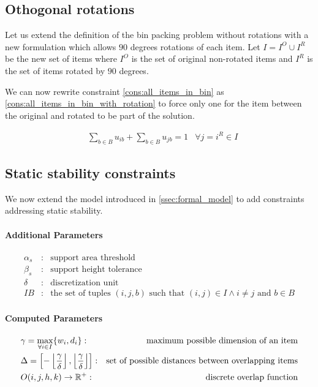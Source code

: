 \subsection*{Othogonal rotations}

Let us extend the definition of the bin packing problem without rotations with a new formulation which allows $90$ degrees rotations of each item.
Let $I = I^O \cup I^R$ be the new set of items where $I^O$ is the set of original non-rotated items and $I^R$ is the set of items rotated by $90$ degrees.

We can now rewrite constraint \ref{cons:all_items_in_bin} as \ref{cons:all_items_in_bin_with_rotation} to force only one for the item between the original and rotated to be part of the solution.

\begin{align}
    & \sum\limits_{b \in B} u_{ib} + \sum\limits_{b \in B} u_{jb} = 1 & \forall j = i^R \in I \label{cons:all_items_in_bin_with_rotation}
\end{align}

\subsection*{Static stability constraints}

We now extend the model introduced in \cref{ssec:formal_model} to add constraints addressing static stability.

\paragraph*{Additional Parameters}
\begin{eqnarray*}
    \alpha_s  &:& \text{support area threshold} \\
    \beta_s  &:& \text{support height tolerance} \\
    \delta      &:& \text{discretization unit} \\
    IB &:& \text{the set of tuples $(i, j, b)$ such that $(i,j) \in I \land i \neq j$ and $b \in B$}
\end{eqnarray*}


\paragraph*{Computed Parameters}
\begin{eqnarray}
    & \gamma = \max_{\forall i \in I}\{ w_i, d_i \}  :& \text{maximum possible dimension of an item} \notag \\
    & \Delta =  \left[ - \left\lfloor \frac{ \gamma }{\delta} \right\rfloor, \left\lfloor \frac{ \gamma }{\delta} \right\rfloor \right]  :& \text{set of possible distances between overlapping items} \notag \\
    & O(i, j, h, k) \rightarrow \mathbb{R}^+ :& \text{discrete overlap function} \label{eq:overlap_function}
\end{eqnarray}

